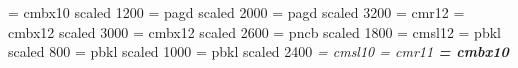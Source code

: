 \newcommand{\Dfrac}[2]{\frac{\displaystyle #1}{\displaystyle #2}}
\newcommand{\cia}{\clearpage\newpage\hfill\\}
\newcommand{\F}[1]{Figure~\ref{#1}}
\renewcommand{\textfraction}{0.05} %

\font\frtnbf  = cmbx10 scaled 1200      
\font\abe     = pagd scaled 2000       
\font\abin    = pagd scaled 3200       
\font\acb     = cmr12                  
\font\abeb    = cmbx12 scaled 3000    
\font\abebb   = cmbx12 scaled 2600     
\font\add     = pncb scaled 1800        
\font\ssl     = cmsl12               
\font\aaa     = pbkl scaled 800
\font\bbb     = pbkl scaled 1000
\font\bbbb    = pbkl scaled 2400
\font\sl      = cmsl10                 
\font\rm      = cmr11                 
\font\bf      = cmbx10                  
